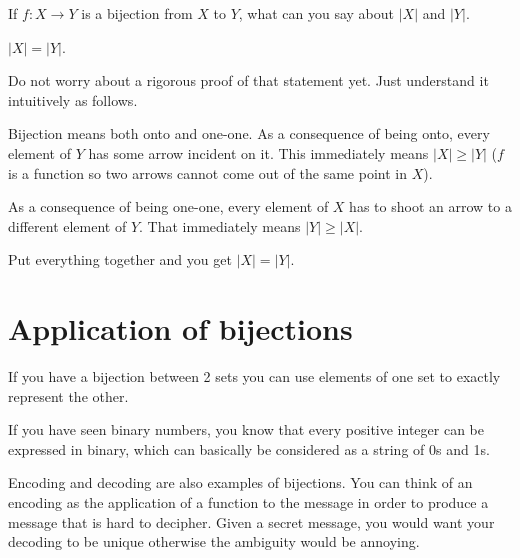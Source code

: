 \documentclass[12pt]{article}
\begin{document}
\medskip

If $f: X \rightarrow Y$ is a bijection from $X$ to $Y$, what can you say about $|X|$ and $|Y|$.

$|X| = |Y|$.


Do not worry about a rigorous proof of that statement yet. Just understand it intuitively as follows. 


Bijection means both onto and one-one. As a consequence of being onto, every element of $Y$ has some arrow incident on it. This immediately means $|X| \ge |Y|$ ($f$ is a function so two arrows cannot come out of the same point in $X$).

As a consequence of being one-one, every element of $X$ has to shoot an arrow to a different element of $Y$. That immediately means $|Y| \ge |X|$. 

Put everything together and you get $|X| = |Y|$.

\section*{Application of bijections}

If you have a bijection between 2 sets you can use elements of one set to exactly represent the other.

If you have seen binary numbers, you know that every positive integer can be expressed in binary, which can basically be considered as a string of 0s and 1s. 

Encoding and decoding are also examples of bijections. You can think of an encoding as the application of a function to the message in order to produce a message that is hard to decipher. Given a secret message, you would want your decoding to be unique otherwise the ambiguity would be annoying.
\end{document}

